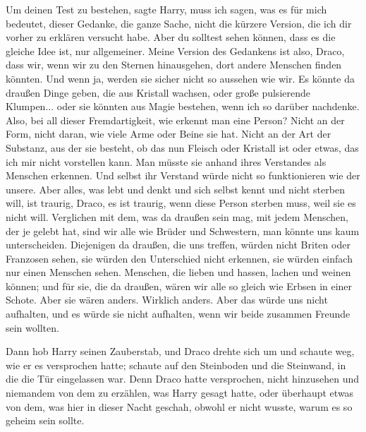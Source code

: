 \glqq Um deinen Test zu bestehen\grqq{}, sagte Harry, \glqq muss ich sagen, was
es für mich bedeutet, dieser Gedanke, die ganze Sache, nicht die kürzere
Version, die ich dir vorher zu erklären versucht habe. Aber du solltest sehen
können, dass es die gleiche Idee ist, nur allgemeiner. Meine Version des
Gedankens ist also, Draco, dass wir, wenn wir zu den Sternen hinausgehen, dort
andere Menschen finden könnten. Und wenn ja, werden sie sicher nicht so aussehen
wie wir. Es könnte da draußen Dinge geben, die aus Kristall wachsen, oder große
pulsierende Klumpen... oder sie könnten aus Magie bestehen, wenn ich so darüber
nachdenke. Also, bei all dieser Fremdartigkeit, wie erkennt man eine Person?
Nicht an der Form, nicht daran, wie viele Arme oder Beine sie hat. Nicht an der
Art der Substanz, aus der sie besteht, ob das nun Fleisch oder Kristall ist oder
etwas, das ich mir nicht vorstellen kann. Man müsste sie anhand ihres Verstandes
als Menschen erkennen. Und selbst ihr Verstand würde nicht so funktionieren wie
der unsere. Aber alles, was lebt und denkt und sich selbst kennt und nicht
sterben will, ist traurig, Draco, es ist traurig, wenn diese Person sterben
muss, weil sie es nicht will. Verglichen mit dem, was da draußen sein mag, mit
jedem Menschen, der je gelebt hat, sind wir alle wie Brüder und Schwestern, man
könnte uns kaum unterscheiden. Diejenigen da draußen, die uns treffen, würden
nicht Briten oder Franzosen sehen, sie würden den Unterschied nicht erkennen,
sie würden einfach nur einen Menschen sehen. Menschen, die lieben und hassen,
lachen und weinen können; und für sie, die da draußen, wären wir alle so gleich
wie Erbsen in einer Schote. Aber sie wären anders. Wirklich anders. Aber das
würde uns nicht aufhalten, und es würde sie nicht aufhalten, wenn wir beide
zusammen Freunde sein wollten.\grqq{}

Dann hob Harry seinen Zauberstab, und Draco drehte sich um und schaute weg, wie
er es versprochen hatte; schaute auf den Steinboden und die Steinwand, in die
die Tür eingelassen war. Denn Draco hatte versprochen, nicht hinzusehen und
niemandem von dem zu erzählen, was Harry gesagt hatte, oder überhaupt etwas von
dem, was hier in dieser Nacht geschah, obwohl er nicht wusste, warum es so
geheim sein sollte.


